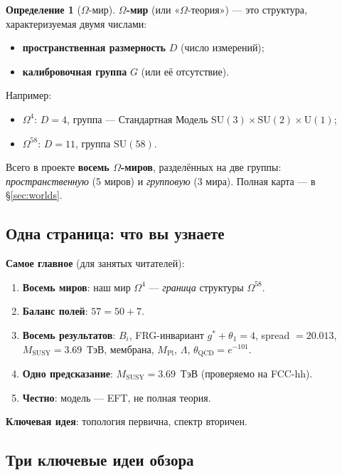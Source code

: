 \documentclass[11pt,a4paper]{article}
\newcommand{\SU}{\mathrm{SU}}
\newcommand{\Om}{\Omega^4}
\newcommand{\Omfi}{\Omega^{58}}
\theoremstyle{definition}
\newtheorem{definition}[theorem]{Определение}
\begin{document}
\begin{definition}[$\Omega$-мир]
\label{def:omega-world}
\textbf{$\Omega$-мир} (или «$\Omega$-теория») — это структура, 
характеризуемая двумя числами:
\begin{itemize}
    \item \textbf{пространственная размерность} $D$ 
          (число измерений);
    \item \textbf{калибровочная группа} $G$ (или её отсутствие).
\end{itemize}
Например:
\begin{itemize}
    \item $\Om$: $D = 4$, группа — Стандартная Модель 
          $\SU(3) \times \SU(2) \times \mathrm{U}(1)$;
    \item $\Omfi$: $D = 11$, группа $\SU(58)$.
\end{itemize}
Всего в проекте \textbf{восемь $\Omega$-миров}, разделённых 
на две группы: \emph{пространственную} (5 миров) и 
\emph{групповую} (3 мира). Полная карта — в §\ref{sec:worlds}.
\end{definition}

\subsection{Одна страница: что вы узнаете}
\label{subsec:one-page}

\textbf{Самое главное} (для занятых читателей):

\begin{enumerate}
    \item \textbf{Восемь миров}: наш мир $\Om$ --- \emph{граница} 
          структуры $\Omega^{58}$.
    \item \textbf{Баланс полей}: $57 = 50 + 7$.
    \item \textbf{Восемь результатов}: $B_i$, FRG-инвариант 
          $g^*+\theta_1 = 4$, spread $= 20.013$, 
          $M_{\text{SUSY}} = 3.69$~ТэВ, мембрана, 
          $M_{\text{Pl}}$, $\Lambda$, $\theta_{\text{QCD}} = e^{-101}$.
    \item \textbf{Одно предсказание}: $M_{\text{SUSY}} = 3.69$~ТэВ 
          (проверяемо на FCC-hh).
    \item \textbf{Честно}: модель --- EFT, не полная теория.
\end{enumerate}

\medskip\noindent
\textbf{Ключевая идея}: топология первична, спектр вторичен.

\subsection{Три ключевые идеи обзора}
\end{document}
